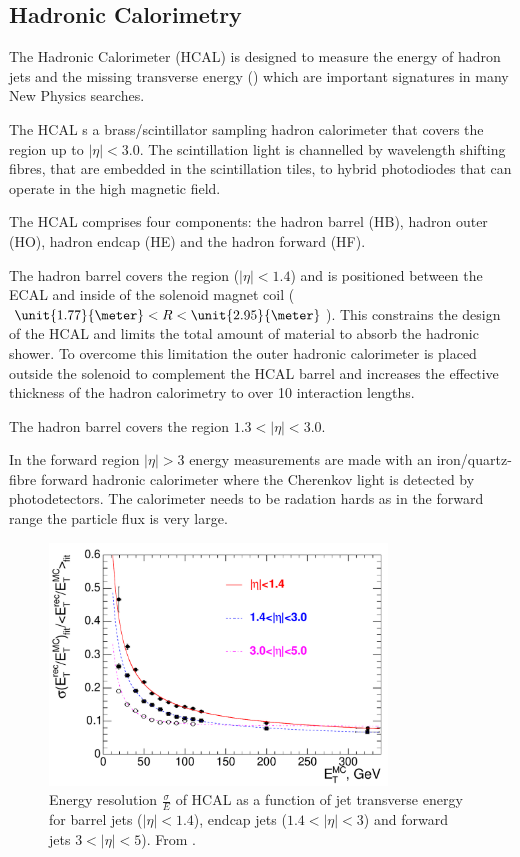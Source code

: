 \subsection{Hadronic Calorimetry}

The Hadronic Calorimeter (HCAL) is designed to measure the energy of
hadron jets and the missing transverse energy (\met) which are important
signatures in many New Physics searches.

The HCAL s a brass/scintillator sampling hadron calorimeter that covers the
region up to $|\eta|<3.0$.
The scintillation light is channelled by wavelength shifting fibres, that are
embedded in the scintillation tiles, to hybrid photodiodes that can operate in
the high magnetic field. \cite{cms}

The HCAL comprises four components: the hadron barrel (HB), hadron outer (HO),
hadron endcap (HE) and the hadron forward (HF).

The hadron barrel covers the region ($|\eta| < 1.4$) and is positioned between
the ECAL and inside of the solenoid magnet coil
($\unit{1.77}{\meter}<R<\unit{2.95}{\meter}$).
This constrains the design of the HCAL and limits the total amount of material
to absorb the hadronic shower. 
To overcome this limitation the outer hadronic calorimeter is
placed outside the solenoid to complement the HCAL barrel and increases the
effective thickness of the hadron calorimetry to over 10 interaction lengths.

The hadron barrel covers the region $1.3 < |\eta| < 3.0$.

In the forward region $|\eta| > 3$ energy measurements are made with an
iron/quartz-fibre forward hadronic calorimeter where the Cherenkov light is
detected by photodetectors. The calorimeter needs to be radation hards as in the
forward range the particle flux is very large.

\begin{figure}[htb!]
  \centering
  \includegraphics[width=0.8\textwidth]{hcal_performance}
  \caption{Energy resolution $\frac{\sigma}{E}$ of HCAL as a function of jet
  \label{fig:HCAL}
transverse energy for barrel jets ($|\eta| < 1.4$), endcap jets ($1.4<|\eta| <
3$) and forward jets $3<|\eta| < 5$). From \cite{cms}.}
\end{figure}


